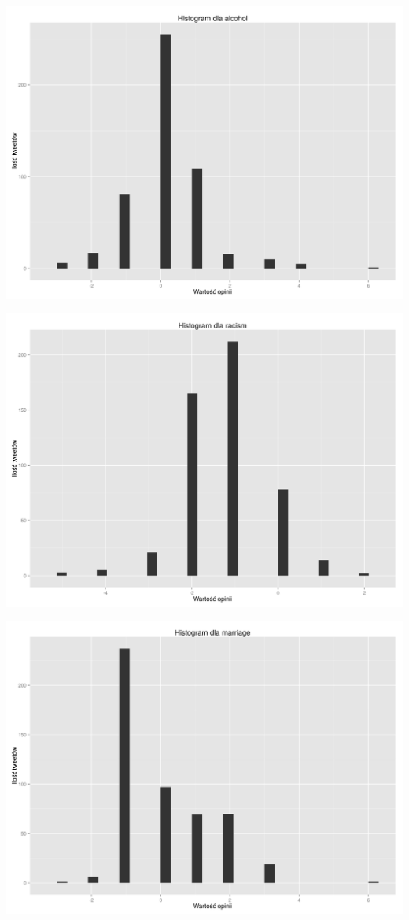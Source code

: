 \documentclass[12pt,a4paper]{article}
\begin{document}
\begin{center}
\includegraphics[scale=0.35]{pictures/Histalcohol.png}
\end{center}

\begin{center}
\includegraphics[scale=0.35]{pictures/Histracism.png}
\end{center}

\begin{center}
\includegraphics[scale=0.35]{pictures/Histmarriage.png}
\end{center}
\end{document}
